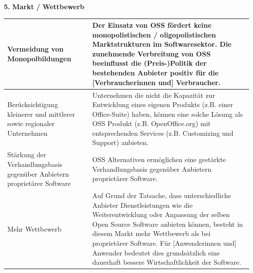 \documentclass[a4paper]{article}
\newcommand\textstyleACRONYM[1]{#1}
\begin{document}
\bigskip


\bigskip


\bigskip

{
\textbf{5.}\textbf{ }\textbf{Markt}\textbf{ }\textbf{/}\textbf{
}\textbf{Wettbewerb}}


\bigskip

\begin{flushleft}
\tablehead{}
\begin{supertabular}{|m{1.8900598in}m{4.77126in}|}
\hline
{}
\hypertarget{VermeidungvonMonopolbildung}{}Vermeidung von
Monopolbildungen &
 Der Einsatz von \textstyleACRONYM{OSS}
f\"ordert keine monopolistischen / oligopolistischen Marktstrukturen im
Softwaresektor. Die zunehmende Verbreitung von \textstyleACRONYM{OSS}
beeinflusst die (Preis-)Politik der bestehenden Anbieter positiv f\"ur
die [Verbraucherinnen und] Verbraucher.\\\hline
{}
\hypertarget{BercksichtigungregionalerUnternehmen}{}Ber\"ucksichtigung
kleinerer und mittlerer sowie regionaler Unternehmen &
 Unternehmen die nicht die Kapazit\"at zur
Entwicklung eines eigenen Produkts (\textstyleACRONYM{z.B.} einer
Office-Suite) haben, k\"onnen eine solche L\"osung als
\textstyleACRONYM{OSS} Produkt (\textstyleACRONYM{z.B.} OpenOffice.org)
mit entsprechenden Services (\textstyleACRONYM{z.B.} Customizing und
Support) anbieten.\\\hline
{} St\"arkung der Verhandlungsbasis gegen\"uber
Anbietern propriet\"arer Software &
 \textstyleACRONYM{OSS} Alternativen
erm\"oglichen eine gest\"arkte Verhandlungsbasis gegen\"uber Anbietern
propriet\"arer Software.\\\hline
{} Mehr Wettbewerb &
 Auf Grund der Tatsache, dass unterschiedliche
Anbieter Dienstleistungen wie die Weiterentwicklung oder Anpassung der
selben Open Source Software anbieten k\"onnen, besteht in diesem Markt
mehr Wettbewerb als bei propriet\"arer Software. F\"ur [Anwenderinnen
und] Anwender bedeutet dies grunds\"atzlich eine dauerhaft bessere
Wirtschaftlichkeit der Software.\\\hline
\end{supertabular}
\end{flushleft}

\bigskip


\bigskip


\bigskip
\end{document}
